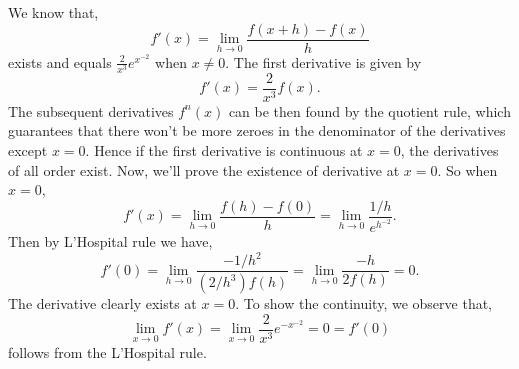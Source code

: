 \begin{solution}
    We know that,
    $$f'(x)=\lim_{h\to 0}{
        \frac{f(x+h)-f(x)}{h}
    }$$
    exists and equals $\frac{2}{x^3}
    e^{x^{-2}}$ when $x\ne 0$. The
    first derivative is given by
    $$f'(x)=\frac{2}{x^3}f(x).$$
    The subsequent derivatives $f^n(x)
    $ can be then found by the
    quotient rule, which guarantees
    that there won't be more zeroes
    in the denominator
    of the derivatives except $x=0$.
    Hence if the first
    derivative is continuous at $x=0$,
    the derivatives of all order exist.
    Now, we'll prove the existence
    of derivative at $x=0$. 
    So when $x=0$,
    $$f'(x)=\lim_{h\to 0}{\frac{
        f(h)-f(0)
    }{h}}=
    \lim_{h\to 0}{
        \frac{1/h}{e^{h^{-2}}}}.$$
    Then by L'Hospital rule we have,
    $$f'(0)=\lim_{h\to 0}{\frac{
        -1/h^2
    }{(2/h^3)f(h)}}=
    \lim_{h\to 0}{\frac{-h}{2f(h)}}
    =0.$$
    The derivative clearly exists at
    $x=0$. To show the continuity, we
    observe that,
    $$\lim_{x\to 0}{f'(x)}=
    \lim_{x\to 0}{\frac{2}{x^3}e^{-x^
    {-2}}}=0=f'(0)$$
    follows from the L'Hospital rule.
    
\end{solution}